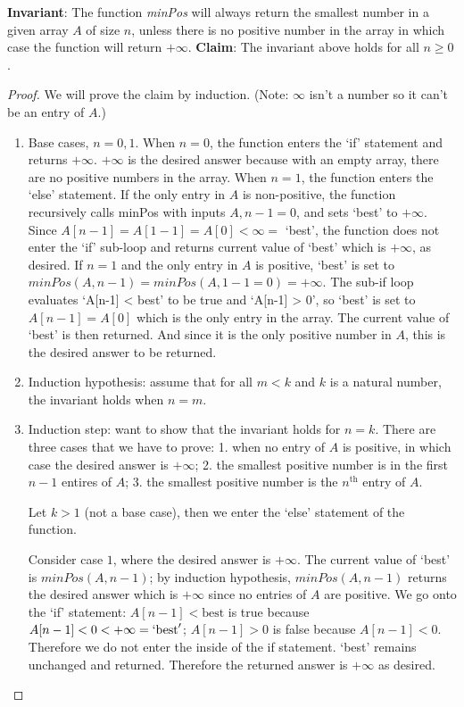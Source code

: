 \documentclass{article}
\begin{document}
    \textbf{Invariant}: The function \textit{minPos} will always return the smallest number in a given array 
    $A$ of size $n$, unless there is no positive number in the array in which case the function will return $+\infty$.
    \textbf{Claim}: The invariant above holds for all $n\geq 0$. 
    \begin{proof}
      We will prove the claim by induction. (Note: $\infty$ isn't a number so it can't be an entry of $A$.)
      \begin{enumerate}
        \item Base cases, $n=0,1$. When $n=0$, the function enters the `if' statement and returns $+\infty$. $+\infty$ is the 
        desired answer because with an empty array, there are no positive numbers in the array. 
        When $n=1$, the function enters the  `else' statement.
        If the only entry in $A$ is non-positive, the function recursively 
        calls minPos with inputs $A, n-1 = 0$, and sets `best' to $+\infty$. Since $A[n-1] = A[1-1] = A[0] < \infty =$ `best', 
        the function does not enter the `if' sub-loop and returns current value of `best' which is $+\infty$, as desired.  
        If $n=1$ and the only entry in $A$ is positive, `best' is set to $minPos(A,n-1) = minPos(A,1-1=0) = +\infty$. 
        The sub-if loop evaluates `A[n-1] < best' to be true and `A[n-1] > 0', so `best' is set to $A[n-1] = A[0]$ which is the only
        entry in the array. The current value of `best' is then returned. 
        And since it is the only positive number in $A$, this is the desired answer to be returned. 
        \item Induction hypothesis: assume that for all $m<k$ and $k$ is a natural number, the invariant holds when $n=m$. 
        \item Induction step: want to show that the invariant holds for $n=k$. 
        There are three cases that we have to prove: 1. when no entry of $A$ is positive, in which case the desired answer is $+\infty$; 
        2. the smallest positive number is in the first $n-1$ entires of $A$; 3. the smallest positive number is the $n^{\text{th}}$ entry of $A$. 
      
        Let $k>1$ (not a base case), then we enter the  `else' statement of the function. 

        Consider case $1$, where the desired answer is $+\infty$. 
        The current value of `best' is $minPos(A,n-1)$; by induction hypothesis, $minPos(A,n-1)$ returns the desired answer which is $+\infty$ 
        since no entries of $A$ are positive. We go onto the `if' statement: $A[n-1] < \text{best}$ is true because $A[n-1] < 0 < +\infty = `\text{best}'$; 
        $A[n-1] > 0$ is false because $A[n-1] < 0$.
        Therefore we do not enter the inside of the if statement. `best' remains unchanged and returned. Therefore the 
        returned answer is $+\infty$ as desired. 


\end{enumerate}
\end{proof}
\end{document}
